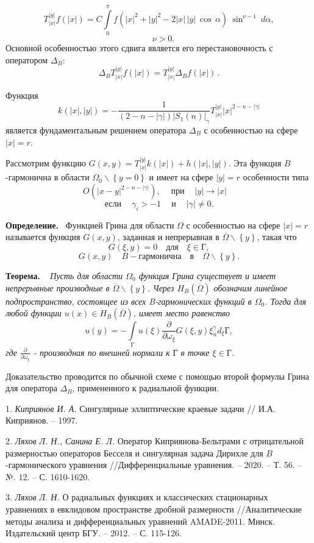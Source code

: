 $$T_{|x|}^{|y|}f(|x|)=C\int\limits_0^{\pi}
f\left(|x|^2+|y|^2-2|x|\,|y|~\cos\,\alpha\right)
~ \sin^{{\nu}-1}~d\alpha,$$
$$\quad \nu>0.$$
 Основной особенностью этого сдвига является его перестановочность с оператором $\Delta_B$:
$$
\Delta_B T_{|x|}^{|y|} f(|x|)=T_{|x|}^{|y|}\Delta_B f(|x|)\,.
$$
 
Функция
$$
k(|x|,|y|)=-\frac{1}{(2-n-|\gamma|)|S_1(n)|_\gamma
}T_{|x|}^{|y|} {|x|^{2-n-|\gamma|}}
$$
является фундаментальным решением оператора $\Delta_B$ с особенностью на сфере $|x|=r$.

Рассмотрим функцию
$ G(x,y)= T_{|x|}^{|y|}k(|x|)+h(|x|,|y|)$.
Эта функция $B$-гармонична в области ${\Omega_0}\backslash\left\{{y=0}\right\}$ и имеет на сфере
 $|y|=r$ особенности типа 
$$O(|x-y|^{2-n-|\gamma|}),\quad \ \textrm{при} \ \quad |y|\to|x|\quad$$
$$\textrm{если} \ \quad \gamma_i>-1\quad \ \textrm{и} \ \quad |\gamma|\neq0.$$

{\bf Определение.}~ Функцией Грина для области ${\Omega}$ с особенностью на сфере $|x|=r$ называется функция $G(x,y)$, заданная и непрерывная в $\overline{\Omega}\backslash\left\{{y}\right\}$, такая что 
$$G(\xi,y)=0 \quad \textrm{для} \quad \xi\in\textrm{Г},$$
$$G(x,y)\quad B-\textrm{гармонична} \quad \textrm{в} \quad {\Omega}\backslash\left\{{y}\right\}.$$

{\bf Теорема.} ~ {\it Пусть для области $\Omega_0$ функция Грина существует и имеет непрерывные производные в $\overline{\Omega}\backslash\left\{{y}\right\}$. Через ${H_B{(\overline{\Omega})}}$ обозначим линейное подпространство,  состоящее из всех B-гармонических функций в $\Omega_0$. Тогда для любой функции $u(x)\in{H_B{(\overline{\Omega})}}$,  имеет место равенство
$$u(y)=-{\int\limits_\textrm{Г} {u(\xi)\frac{\partial}{\partial {\omega_\xi}}{G(\xi,y)}{\xi_n^\gamma}{{d_\xi}\textrm{Г}}}},$$
где $\frac{\partial}{\partial {\omega_\xi}}$ - производная по внешней нормали к $\textrm{Г}$ в точке $\xi\in \textrm{Г}$. }

Доказательство проводится по обычной схеме с помощью второй формулы Грина для оператора $\Delta_B$, примененного к радиальной функции.


\litlist

1. {\it Киприянов И. А.}
 Сингулярные эллиптические краевые задачи // И.А. Киприянов. – 1997.

2. {\it Ляхов Л. Н., Санина Е. Л.}
 Оператор Киприянова-Бельтрами с отрицательной размерностью операторов Бесселя и сингулярная задача Дирихле для $ B $-гармонического уравнения //Дифференциальные уравнения. – 2020. – Т. 56. – №. 12. – С. 1610-1620.

3. {\it Ляхов Л. Н.}
 О радиальных функциях и классических стационарных уравнениях в евклидовом пространстве дробной размерности //Аналитические методы анализа и дифференциальных уравнений AMADE-2011. Минск. Издательский центр БГУ. – 2012. – С. 115-126.

